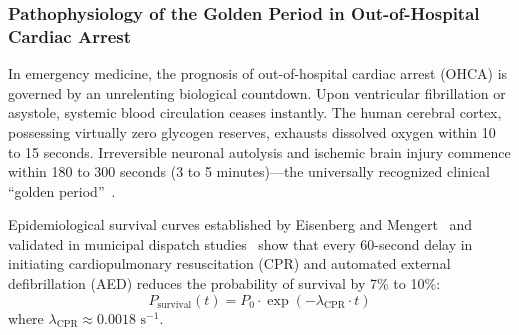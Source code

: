 \documentclass[journal,compsoc]{IEEEtran}
\begin{document}
\subsubsection{Pathophysiology of the Golden Period in Out-of-Hospital Cardiac Arrest}
In emergency medicine, the prognosis of out-of-hospital cardiac arrest (OHCA) is governed by an unrelenting biological countdown. Upon ventricular fibrillation or asystole, systemic blood circulation ceases instantly. The human cerebral cortex, possessing virtually zero glycogen reserves, exhausts dissolved oxygen within 10 to 15 seconds. Irreversible neuronal autolysis and ischemic brain injury commence within 180 to 300 seconds (3 to 5 minutes)—the universally recognized clinical ``golden period''~\cite{eisenberg2001cardiac}. 

Epidemiological survival curves established by Eisenberg and Mengert~\cite{eisenberg2001cardiac} and validated in municipal dispatch studies~\cite{zandbergen2022accuracy} show that every 60-second delay in initiating cardiopulmonary resuscitation (CPR) and automated external defibrillation (AED) reduces the probability of survival by 7\% to 10\%:
\begin{equation}
P_{\text{survival}}(t) = P_0 \cdot \exp\left(-\lambda_{\text{CPR}} \cdot t\right)
\end{equation}
where $\lambda_{\text{CPR}} \approx 0.0018 \text{ s}^{-1}$.
\end{document}
